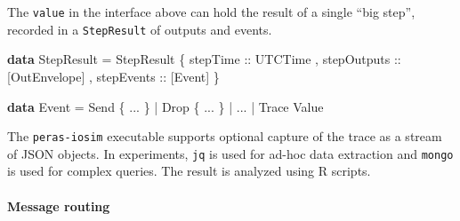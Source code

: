 \documentclass[10pt]{article}
\newenvironment{Shaded}{}{}
\newcommand{\DataTypeTok}[1]{\textcolor[rgb]{0.56,0.13,0.00}{#1}}
\newcommand{\KeywordTok}[1]{\textcolor[rgb]{0.00,0.44,0.13}{\textbf{#1}}}
\newcommand{\NormalTok}[1]{#1}
\newcommand{\OperatorTok}[1]{\textcolor[rgb]{0.40,0.40,0.40}{#1}}
\newcommand{\OtherTok}[1]{\textcolor[rgb]{0.00,0.44,0.13}{#1}}
\begin{document}
The \texttt{value} in the interface above can hold the result of a
single ``big step'', recorded in a \texttt{StepResult} of outputs and
events.

\begin{Shaded}
\begin{Highlighting}[]
\KeywordTok{data} \DataTypeTok{StepResult} \OtherTok{=} \DataTypeTok{StepResult}
\NormalTok{  \{}\OtherTok{ stepTime ::} \DataTypeTok{UTCTime}
\NormalTok{  ,}\OtherTok{ stepOutputs ::}\NormalTok{ [}\DataTypeTok{OutEnvelope}\NormalTok{]}
\NormalTok{  ,}\OtherTok{ stepEvents ::}\NormalTok{ [}\DataTypeTok{Event}\NormalTok{]}
\NormalTok{  \}}

\KeywordTok{data} \DataTypeTok{Event}
  \OtherTok{=} \DataTypeTok{Send}\NormalTok{ \{ }\OperatorTok{...}\NormalTok{ \}}
  \OperatorTok{|} \DataTypeTok{Drop}\NormalTok{ \{ }\OperatorTok{...}\NormalTok{ \}}
  \OperatorTok{|} \OperatorTok{...}
  \OperatorTok{|} \DataTypeTok{Trace} \DataTypeTok{Value}
\end{Highlighting}
\end{Shaded}

The \texttt{peras-iosim} executable supports optional capture of the
trace as a stream of JSON objects. In experiments, \texttt{jq} is used
for ad-hoc data extraction and \texttt{mongo} is used for complex
queries. The result is analyzed using R scripts.

\paragraph{Message routing}\label{message-routing}
\end{document}
